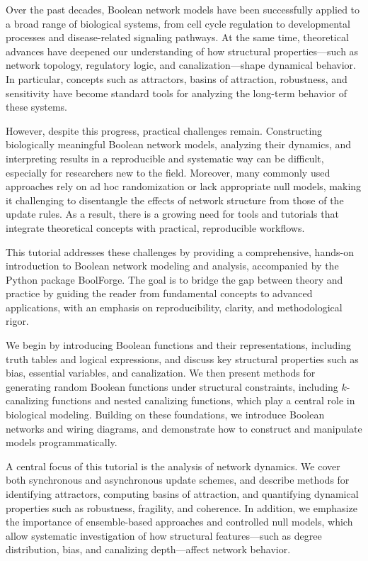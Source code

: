 \documentclass[
]{article}
\begin{document}
Over the past decades, Boolean network models have been successfully
applied to a broad range of biological systems, from cell cycle
regulation to developmental processes and disease-related signaling
pathways. At the same time, theoretical advances have deepened our
understanding of how structural properties---such as network topology,
regulatory logic, and canalization---shape dynamical behavior. In
particular, concepts such as attractors, basins of attraction,
robustness, and sensitivity have become standard tools for analyzing the
long-term behavior of these systems.

However, despite this progress, practical challenges remain.
Constructing biologically meaningful Boolean network models, analyzing
their dynamics, and interpreting results in a reproducible and
systematic way can be difficult, especially for researchers new to the
field. Moreover, many commonly used approaches rely on ad hoc
randomization or lack appropriate null models, making it challenging to
disentangle the effects of network structure from those of the update
rules. As a result, there is a growing need for tools and tutorials that
integrate theoretical concepts with practical, reproducible workflows.

This tutorial addresses these challenges by providing a comprehensive,
hands-on introduction to Boolean network modeling and analysis,
accompanied by the Python package BoolForge. The goal is to bridge the
gap between theory and practice by guiding the reader from fundamental
concepts to advanced applications, with an emphasis on reproducibility,
clarity, and methodological rigor.

We begin by introducing Boolean functions and their representations,
including truth tables and logical expressions, and discuss key
structural properties such as bias, essential variables, and
canalization. We then present methods for generating random Boolean
functions under structural constraints, including \(k\)-canalizing
functions and nested canalizing functions, which play a central role in
biological modeling. Building on these foundations, we introduce Boolean
networks and wiring diagrams, and demonstrate how to construct and
manipulate models programmatically.

A central focus of this tutorial is the analysis of network dynamics. We
cover both synchronous and asynchronous update schemes, and describe
methods for identifying attractors, computing basins of attraction, and
quantifying dynamical properties such as robustness, fragility, and
coherence. In addition, we emphasize the importance of ensemble-based
approaches and controlled null models, which allow systematic
investigation of how structural features---such as degree distribution,
bias, and canalizing depth---affect network behavior.
\end{document}
